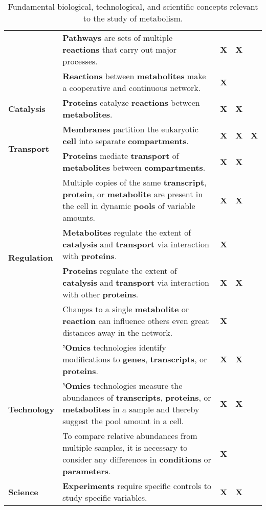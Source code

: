 \begin{table}[htbp]
\begin{tabular}{ |m{1.9cm}|m{11cm}|m{1cm}|m{1.3cm}|m{1cm}| }
\cline{2-5}
& \textbf{Pathways} are sets of multiple \textbf{reactions} that carry out major processes.
& \textbf{X}
& \textbf{X}
&
\\
\cline{2-5}
& \textbf{Reactions} between \textbf{metabolites} make a cooperative and continuous network.
& \textbf{X}
&
&
\\
\hline
\multirow{1}{1.5cm}{\textbf{Catalysis}}
& \textbf{Proteins} catalyze \textbf{reactions} between \textbf{metabolites}.
& \textbf{X}
& \textbf{X}
&
\\
\hline
\multirow{2}{1.5cm}{\textbf{Transport}}
& \textbf{Membranes} partition the eukaryotic \textbf{cell} into separate \textbf{compartments}.
& \textbf{X}
& \textbf{X}
& \textbf{X}
\\
\cline{2-5}
& \textbf{Proteins} mediate \textbf{transport} of \textbf{metabolites} between \textbf{compartments}.
& \textbf{X}
& \textbf{X}
&
\\
\hline
\multirow{4}{1.5cm}{\textbf{Regulation}}
& Multiple copies of the same \textbf{transcript}, \textbf{protein}, or \textbf{metabolite} are present in the cell in dynamic \textbf{pools} of variable amounts.
& \textbf{X}
& \textbf{X}
&
\\
\cline{2-5}
& \textbf{Metabolites} regulate the extent of \textbf{catalysis} and \textbf{transport} via interaction with \textbf{proteins}.
& \textbf{X}
&
&
\\
\cline{2-5}
& \textbf{Proteins} regulate the extent of \textbf{catalysis} and \textbf{transport} via interaction with other \textbf{proteins}.
& \textbf{X}
& \textbf{X}
&
\\
\cline{2-5}
& Changes to a single \textbf{metabolite} or \textbf{reaction} can influence others even great distances away in the network.
& \textbf{X}
&
&
\\
\hline
\multirow{3}{1.5cm}{\textbf{Technology}}
& \textbf{'Omics} technologies identify modifications to \textbf{genes}, \textbf{transcripts}, or \textbf{proteins}.
& \textbf{X}
& \textbf{X}
&
\\
\cline{2-5}
& \textbf{'Omics} technologies measure the abundances of \textbf{transcripts}, \textbf{proteins}, or \textbf{metabolites} in a sample and thereby suggest the pool amount in a cell.
& \textbf{X}
& \textbf{X}
&
\\
\cline{2-5}
& To compare relative abundances from multiple samples, it is necessary to consider any differences in \textbf{conditions} or \textbf{parameters}.
& \textbf{X}
&
&
\\
\hline
\multirow{1}{1.5cm}{\textbf{Science}}
& \textbf{Experiments} require specific controls to study specific variables.
& \textbf{X}
& \textbf{X}
&
\\
\hline
\end{tabular}
\caption{Fundamental biological, technological, and scientific concepts relevant to the study of metabolism.}
\label{table:concept}
\end{table}

